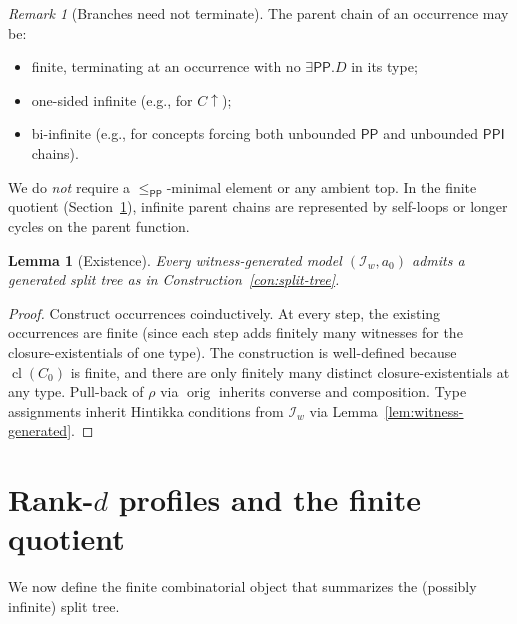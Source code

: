 \documentclass[11pt]{article}
\newtheorem{lemma}[theorem]{Lemma}
\theoremstyle{definition}
\theoremstyle{remark}
\newtheorem{remark}[theorem]{Remark}
\newcommand{\PP}{\mathsf{PP}}
\newcommand{\PPI}{\mathsf{PPI}}
\newcommand{\cl}{\operatorname{cl}}
\newcommand{\orig}{\operatorname{orig}}
\begin{document}
\begin{remark}[Branches need not terminate]\label{rem:no-root}
The parent chain of an occurrence may be:
\begin{itemize}
\item finite, terminating at an occurrence with no $\exists\PP.D$
  in its type;
\item one-sided infinite (e.g., for $C\!\uparrow$);
\item bi-infinite (e.g., for concepts forcing both unbounded $\PP$
  and unbounded $\PPI$ chains).
\end{itemize}
We do \emph{not} require a $\le_{\PP}$-minimal element or any
ambient top.  In the finite quotient (Section~\ref{sec:rank-d}),
infinite parent chains are represented by self-loops or longer
cycles on the parent function.
\end{remark}

\begin{lemma}[Existence]\label{lem:split-extraction}
Every witness-generated model $(\mathcal{I}_w, a_0)$ admits a
generated split tree as in Construction~\ref{con:split-tree}.
\end{lemma}

\begin{proof}
Construct occurrences coinductively.  At every step, the existing
occurrences are finite (since each step adds finitely many
witnesses for the closure-existentials of one type).  The
construction is well-defined because $\cl(C_0)$ is finite, and
there are only finitely many distinct closure-existentials at any
type.  Pull-back of $\rho$ via $\orig$ inherits converse and
composition.  Type assignments inherit Hintikka conditions from
$\mathcal{I}_w$ via Lemma~\ref{lem:witness-generated}.
\end{proof}


\section{Rank-$d$ profiles and the finite quotient}
\label{sec:rank-d}

We now define the finite combinatorial object that summarizes the
(possibly infinite) split tree.
\end{document}
